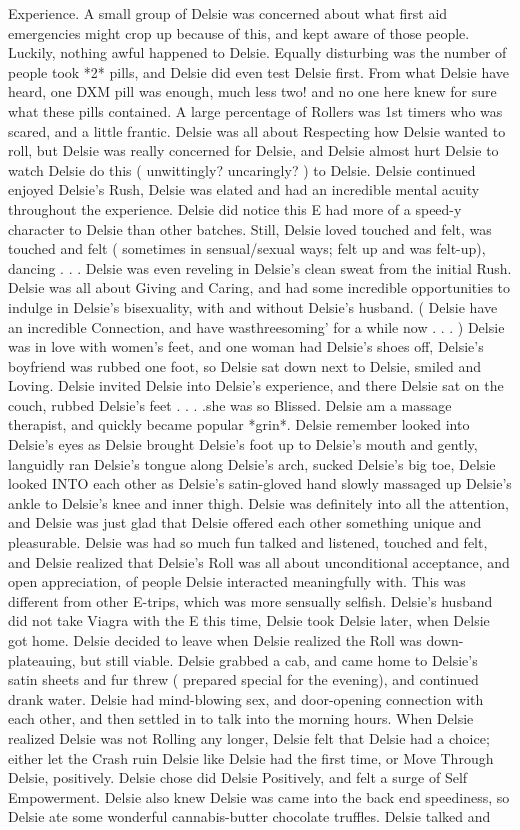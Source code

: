 \documentclass[12pt]{book}
\begin{document}
Experience. A small group of Delsie was concerned about what first aid emergencies might crop up because of this, and kept aware of those people. Luckily, nothing awful happened to Delsie. Equally disturbing was the number of people took *2* pills, and Delsie did even test Delsie first. From what Delsie have heard, one DXM pill was enough, much less two! and no one here knew for sure what these pills contained. A large percentage of Rollers was 1st timers who was scared, and a little frantic. Delsie was all about Respecting how Delsie wanted to roll, but Delsie was really concerned for Delsie, and Delsie almost hurt Delsie to watch Delsie do this ( unwittingly? uncaringly? ) to Delsie. Delsie continued enjoyed Delsie's Rush, Delsie was elated and had an incredible mental acuity throughout the experience. Delsie did notice this E had more of a speed-y character to Delsie than other batches. Still, Delsie loved touched and felt, was touched and felt ( sometimes in sensual/sexual ways; felt up and was felt-up), dancing . . .  Delsie was even reveling in Delsie's clean sweat from the initial Rush. Delsie was all about Giving and Caring, and had some incredible opportunities to indulge in Delsie's bisexuality, with and without Delsie's husband. ( Delsie have an incredible Connection, and have wasthreesoming' for a while now . . .   ) Delsie was in love with women's feet, and one woman had Delsie's shoes off, Delsie's boyfriend was rubbed one foot, so Delsie sat down next to Delsie, smiled and Loving. Delsie invited Delsie into Delsie's experience, and there Delsie sat on the couch, rubbed Delsie's feet . . .  .she was so Blissed. Delsie am a massage therapist, and quickly became popular *grin*. Delsie remember looked into Delsie's eyes as Delsie brought Delsie's foot up to Delsie's mouth and gently, languidly ran Delsie's tongue along Delsie's arch, sucked Delsie's big toe, Delsie looked INTO each other as Delsie's satin-gloved hand slowly massaged up Delsie's ankle to Delsie's knee and inner thigh. Delsie was definitely into all the attention, and Delsie was just glad that Delsie offered each other something unique and pleasurable. Delsie was had so much fun talked and listened, touched and felt, and Delsie realized that Delsie's Roll was all about unconditional acceptance, and open appreciation, of people Delsie interacted meaningfully with. This was different from other E-trips, which was more sensually selfish. Delsie's husband did not take Viagra with the E this time, Delsie took Delsie later, when Delsie got home. Delsie decided to leave when Delsie realized the Roll was down-plateauing, but still viable. Delsie grabbed a cab, and came home to Delsie's satin sheets and fur threw ( prepared special for the evening), and continued drank water. Delsie had mind-blowing sex, and door-opening connection with each other, and then settled in to talk into the morning hours. When Delsie realized Delsie was not Rolling any longer, Delsie felt that Delsie had a choice; either let the Crash ruin Delsie like Delsie had the first time, or Move Through Delsie, positively. Delsie chose did Delsie Positively, and felt a surge of Self Empowerment. Delsie also knew Delsie was came into the back end speediness, so Delsie ate some wonderful cannabis-butter chocolate truffles. Delsie talked and 
\end{document}

